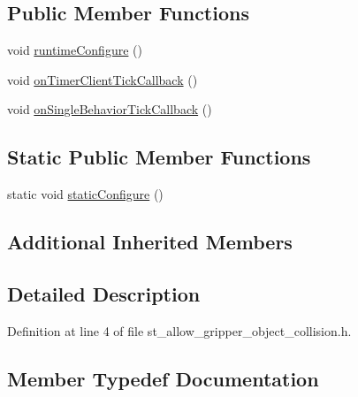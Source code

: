 \subsection*{Public Member Functions}
\begin{DoxyCompactItemize}
\item 
void \hyperlink{structsm__mtc__pour_1_1StAllowGripperObjectCollision_a6c7ce25c5f50ead0ddcaaeb5b5046ba2}{runtime\+Configure} ()
\item 
void \hyperlink{structsm__mtc__pour_1_1StAllowGripperObjectCollision_a337be64b930542f9c6dac6ee51fe7c28}{on\+Timer\+Client\+Tick\+Callback} ()
\item 
void \hyperlink{structsm__mtc__pour_1_1StAllowGripperObjectCollision_aede416032e1e41962e171bbd4e3e7617}{on\+Single\+Behavior\+Tick\+Callback} ()
\end{DoxyCompactItemize}
\subsection*{Static Public Member Functions}
\begin{DoxyCompactItemize}
\item 
static void \hyperlink{structsm__mtc__pour_1_1StAllowGripperObjectCollision_af44f15c98faf7c4cf4e5493abc7c4660}{static\+Configure} ()
\end{DoxyCompactItemize}
\subsection*{Additional Inherited Members}


\subsection{Detailed Description}


Definition at line 4 of file st\+\_\+allow\+\_\+gripper\+\_\+object\+\_\+collision.\+h.



\subsection{Member Typedef Documentation}
